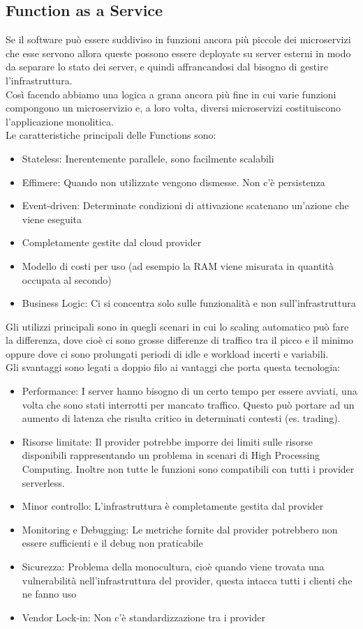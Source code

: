 \documentclass{article}
\begin{document}
		\subsection{Function as a Service}
		Se il software può essere suddiviso in funzioni ancora più piccole dei microservizi che esse servono allora queste possono essere deployate su server esterni in modo da separare lo stato dei server, e quindi affrancandosi dal bisogno di gestire l'infrastruttura.\\
		Così facendo abbiamo una logica a grana ancora più fine in cui varie funzioni compongono un microservizio e, a loro volta, diversi microservizi costituiscono l'applicazione monolitica.\\
		Le caratteristiche principali delle Functions sono:
		\begin{itemize}
		\item Stateless: Inerentemente parallele, sono facilmente scalabili
		\item Effimere: Quando non utilizzate vengono dismesse. Non c'è persistenza
		\item Event-driven: Determinate condizioni di attivazione scatenano un'azione che viene eseguita
		\item Completamente gestite dal cloud provider
		\item Modello di costi per uso (ad esempio la RAM viene misurata in quantità occupata al secondo)
		\item Business Logic: Ci si concentra solo sulle funzionalità e non sull'infrastruttura
		\end{itemize}
		Gli utilizzi principali sono in quegli scenari in cui lo scaling automatico può fare la differenza, dove cioè ci sono grosse differenze di traffico tra il picco e il minimo oppure dove ci sono prolungati periodi di idle e workload incerti e variabili.\\
		Gli svantaggi sono legati a doppio filo ai vantaggi che porta questa tecnologia:
		\begin{itemize}
		\item Performance: I server hanno bisogno di un certo tempo per essere avviati, una volta che sono stati interrotti per mancato traffico. Questo può portare ad un aumento di latenza che risulta critico in determinati contesti (es. trading).
		\item Risorse limitate: Il provider potrebbe imporre dei limiti sulle risorse disponibili rappresentando un problema in scenari di High Processing Computing. Inoltre non tutte le funzioni sono compatibili con tutti i provider serverless.
		\item Minor controllo: L'infrastruttura è completamente gestita dal provider
		\item Monitoring e Debugging: Le metriche fornite dal provider potrebbero non essere sufficienti e il debug non praticabile
		\item Sicurezza: Problema della monocultura, cioè quando viene trovata una vulnerabilità nell'infrastruttura del provider, questa intacca tutti i clienti che ne fanno uso
		\item Vendor Lock-in: Non c'è standardizzazione tra i provider
		\end{itemize}
		
\end{document}
